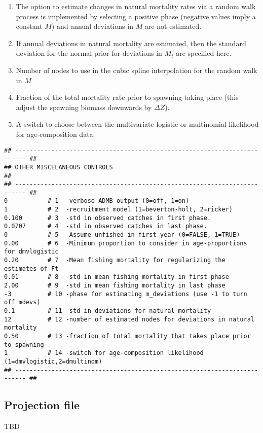 \begin{multicols}{2}
\begin{enumerate}
	\item The option to estimate changes in natural mortality rates via a random walk process is implemented by selecting a positive phase (negative values imply a constant $M$) and annual deviations in $M$ are not estimated.
	
	\item  If annual deviations in natural mortality are estimated, then the standard deviation for the normal prior for deviations in $M_t$ are specified here.
	
	\item Number of nodes to use in the cubic spline interpolation for the random walk in $M$
	
	\item Fraction of the total mortality rate prior to spawning taking place (this adjust the spawning biomass downwards by $\Delta Z$).
	
	\item A switch to choose between the multivariate logistic or multinomial likelihood for age-composition data.
\end{enumerate}




\begin{tiny}
\begin{verbatim}
## ------------------------------------------------------------------------- ##
## OTHER MISCELANEOUS CONTROLS                                               ##
## ------------------------------------------------------------------------- ##
0           # 1  -verbose ADMB output (0=off, 1=on)
1           # 2  -recruitment model (1=beverton-holt, 2=ricker)
0.100       # 3  -std in observed catches in first phase.
0.0707      # 4  -std in observed catches in last phase.
0           # 5  -Assume unfished in first year (0=FALSE, 1=TRUE)
0.00        # 6  -Minimum proportion to consider in age-proportions for dmvlogistic
0.20        # 7  -Mean fishing mortality for regularizing the estimates of Ft
0.01        # 8  -std in mean fishing mortality in first phase
2.00        # 9  -std in mean fishing mortality in last phase
-3          # 10 -phase for estimating m_deviations (use -1 to turn off mdevs)
0.1         # 11 -std in deviations for natural mortality
12          # 12 -number of estimated nodes for deviations in natural mortality
0.50        # 13 -fraction of total mortality that takes place prior to spawning
1           # 14 -switch for age-composition likelihood (1=dmvlogistic,2=dmultinom)
## ------------------------------------------------------------------------- ##
\end{verbatim}
\end{tiny}



\subsection{Projection file} %
\label{sub:projection_file}
TBD


\end{multicols}

